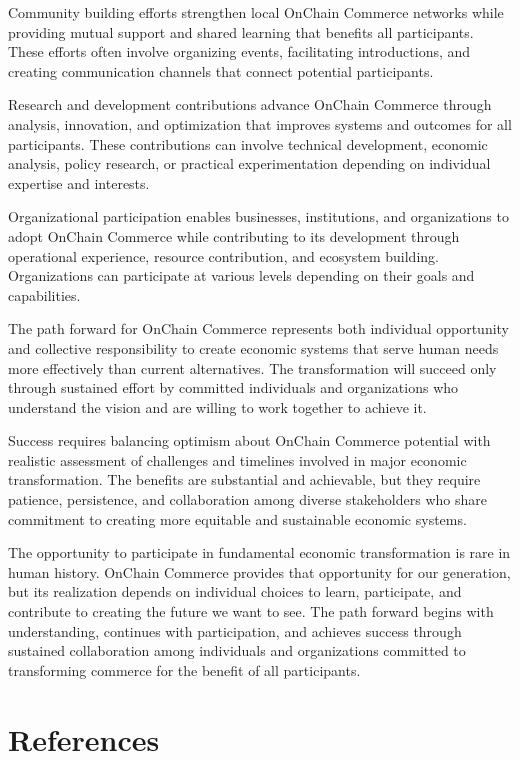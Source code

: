 \documentclass[
  Letterpaper,
]{scrbook}
\begin{document}
Community building efforts strengthen local OnChain Commerce networks
while providing mutual support and shared learning that benefits all
participants. These efforts often involve organizing events,
facilitating introductions, and creating communication channels that
connect potential participants.

Research and development contributions advance OnChain Commerce through
analysis, innovation, and optimization that improves systems and
outcomes for all participants. These contributions can involve technical
development, economic analysis, policy research, or practical
experimentation depending on individual expertise and interests.

Organizational participation enables businesses, institutions, and
organizations to adopt OnChain Commerce while contributing to its
development through operational experience, resource contribution, and
ecosystem building. Organizations can participate at various levels
depending on their goals and capabilities.

The path forward for OnChain Commerce represents both individual
opportunity and collective responsibility to create economic systems
that serve human needs more effectively than current alternatives. The
transformation will succeed only through sustained effort by committed
individuals and organizations who understand the vision and are willing
to work together to achieve it.

Success requires balancing optimism about OnChain Commerce potential
with realistic assessment of challenges and timelines involved in major
economic transformation. The benefits are substantial and achievable,
but they require patience, persistence, and collaboration among diverse
stakeholders who share commitment to creating more equitable and
sustainable economic systems.

The opportunity to participate in fundamental economic transformation is
rare in human history. OnChain Commerce provides that opportunity for
our generation, but its realization depends on individual choices to
learn, participate, and contribute to creating the future we want to
see. The path forward begins with understanding, continues with
participation, and achieves success through sustained collaboration
among individuals and organizations committed to transforming commerce
for the benefit of all participants.


\chapter*{References}\label{references}
\end{document}
